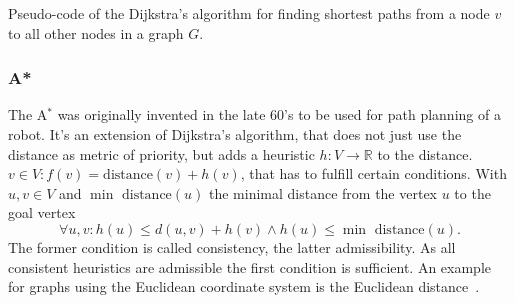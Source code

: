            \begin{algorithm}[htp]
                \hrulealg
            \caption{Pseudo-code of the Dijkstra's algorithm for finding shortest paths from a node $v$ to all other nodes in a graph $G$.}\label{dijkstra}
            \end{algorithm}
        
        
        \subsubsection*{A*}
            The A$^*$ was originally invented in the late 60's to be used for path planning of a robot. 
            It's an extension of Dijkstra's algorithm, that does not just use the distance as metric of priority, but adds a heuristic $h: V \rightarrow \mathbb{R}$ to the distance.
            $v \in V: f(v) = \text{distance}(v) + h(v)$, that has to fulfill certain conditions.
            With $u,v \in V$ and $\min\text{ distance}(u)$ the minimal distance from the  vertex $u$ to the goal vertex
            \[ \forall u,v: h(u) \leq d(u, v) + h(v) \wedge h(u) \leq \min\text{ distance}(u).
            \]
            The former condition is called consistency, the latter admissibility. 
            As all consistent heuristics are admissible the first condition is sufficient.
            An example for graphs using the Euclidean coordinate system is the Euclidean distance~\autocite{hart1968formal}.
            
